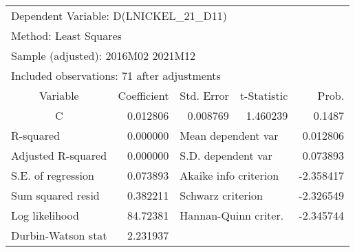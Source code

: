 \begin{tabular}{lrrrr}
\toprule
\multicolumn{3}{l}{Dependent Variable: D(LNICKEL\_21\_D11)}&\multicolumn{1}{c}{}&\multicolumn{1}{c}{}\\
\multicolumn{2}{l}{Method: Least Squares}&\multicolumn{1}{c}{}&\multicolumn{1}{c}{}&\multicolumn{1}{c}{}\\
\multicolumn{3}{l}{Sample (adjusted): 2016M02 2021M12}&\multicolumn{1}{c}{}&\multicolumn{1}{c}{}\\
\multicolumn{4}{l}{Included observations: 71 after adjustments}&\multicolumn{1}{c}{}\\
\midrule
\multicolumn{1}{c}{Variable}&\multicolumn{1}{r}{Coefficient}&\multicolumn{1}{r}{Std. Error}&\multicolumn{1}{r}{t-Statistic}&\multicolumn{1}{r}{Prob.}\\
\midrule
\multicolumn{1}{c}{C}&\multicolumn{1}{r}{0.012806}&\multicolumn{1}{r}{0.008769}&\multicolumn{1}{r}{1.460239}&\multicolumn{1}{r}{0.1487}\\
\midrule
\multicolumn{1}{l}{R-squared}&\multicolumn{1}{r}{0.000000}&\multicolumn{2}{l}{Mean dependent var}&\multicolumn{1}{r}{0.012806}\\
\multicolumn{1}{l}{Adjusted R-squared}&\multicolumn{1}{r}{0.000000}&\multicolumn{2}{l}{S.D. dependent var}&\multicolumn{1}{r}{0.073893}\\
\multicolumn{1}{l}{S.E. of regression}&\multicolumn{1}{r}{0.073893}&\multicolumn{2}{l}{Akaike info criterion}&\multicolumn{1}{r}{-2.358417}\\
\multicolumn{1}{l}{Sum squared resid}&\multicolumn{1}{r}{0.382211}&\multicolumn{2}{l}{Schwarz criterion}&\multicolumn{1}{r}{-2.326549}\\
\multicolumn{1}{l}{Log likelihood}&\multicolumn{1}{r}{84.72381}&\multicolumn{2}{l}{Hannan-Quinn criter.}&\multicolumn{1}{r}{-2.345744}\\
\multicolumn{1}{l}{Durbin-Watson stat}&\multicolumn{1}{r}{2.231937}&\multicolumn{1}{c}{}&\multicolumn{1}{c}{}&\multicolumn{1}{c}{}\\
\bottomrule
\end{tabular}